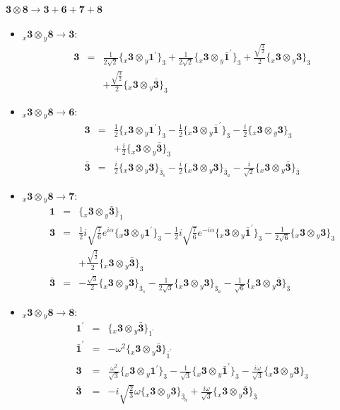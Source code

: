 \documentclass[english]{article}
\newcommand{\rep}[1]{\mathbf{#1}}
\newcommand{\repx}[2]{{}_{#2}\mathbf{#1}}
\newcommand{\subcg}[3]{\big\{ \repx{#1}{x}\otimes\repx{#2}{y}\big\}^{}_{#3}}
\begin{document}
\paragraph*{\Large $\rep{3}\otimes\rep{8}\to\rep{3}+\rep{6}+\rep{7}+\rep{8}$}
\begin{itemize}
\item $\repx{3}{x}\otimes\repx{8}{y}\to\rep{3}$:
\begin{eqnarray*}
\rep{3} &=& \frac{1}{2 \sqrt{2}}\subcg{3}{1^{\prime}}{3}+\frac{1}{2 \sqrt{2}}\subcg{3}{\bar{1}^{\prime}}{3}+\frac{\sqrt{\frac{3}{2}}}{2}\subcg{3}{3}{3} \\ 
 & & +\frac{\sqrt{\frac{3}{2}}}{2}\subcg{3}{\bar{3}}{3}
\end{eqnarray*}
\item $\repx{3}{x}\otimes\repx{8}{y}\to\rep{6}$:
\begin{eqnarray*}
\rep{3} &=& \frac{1}{2}\subcg{3}{1^{\prime}}{3}-\frac{1}{2}\subcg{3}{\bar{1}^{\prime}}{3}-\frac{i}{2}\subcg{3}{3}{3} \\ 
 & & +\frac{i}{2}\subcg{3}{\bar{3}}{3}
\\
\rep{\bar{3}} &=& \frac{i}{2}\subcg{3}{3}{\bar{3}_{s}}-\frac{i}{2}\subcg{3}{3}{\bar{3}_{a}}-\frac{i}{\sqrt{2}}\subcg{3}{\bar{3}}{\bar{3}}
\end{eqnarray*}
\item $\repx{3}{x}\otimes\repx{8}{y}\to\rep{7}$:
\begin{eqnarray*}
\rep{1} &=& \subcg{3}{\bar{3}}{1}
\\
\rep{3} &=& \frac{1}{2} i \sqrt{\frac{7}{6}} e^{i \alpha }\subcg{3}{1^{\prime}}{3}-\frac{1}{2} i \sqrt{\frac{7}{6}} e^{-i \alpha }\subcg{3}{\bar{1}^{\prime}}{3}-\frac{1}{2 \sqrt{6}}\subcg{3}{3}{3} \\ 
 & & +\frac{\sqrt{\frac{3}{2}}}{2}\subcg{3}{\bar{3}}{3}
\\
\rep{\bar{3}} &=& -\frac{\sqrt{3}}{2}\subcg{3}{3}{\bar{3}_{s}}-\frac{1}{2 \sqrt{3}}\subcg{3}{3}{\bar{3}_{a}}-\frac{1}{\sqrt{6}}\subcg{3}{\bar{3}}{\bar{3}}
\end{eqnarray*}
\item $\repx{3}{x}\otimes\repx{8}{y}\to\rep{8}$:
\begin{eqnarray*}
\rep{1^{\prime}} &=& \subcg{3}{\bar{3}}{1^{\prime}}
\\
\rep{\bar{1}^{\prime}} &=& -\omega ^2\subcg{3}{\bar{3}}{\bar{1}^{\prime}}
\\
\rep{3} &=& \frac{\omega ^2}{\sqrt{3}}\subcg{3}{1^{\prime}}{3}-\frac{1}{\sqrt{3}}\subcg{3}{\bar{1}^{\prime}}{3}-\frac{i \omega }{\sqrt{3}}\subcg{3}{3}{3}
\\
\rep{\bar{3}} &=& -i \sqrt{\frac{2}{3}} \omega\subcg{3}{3}{\bar{3}_{a}}+\frac{i \omega }{\sqrt{3}}\subcg{3}{\bar{3}}{\bar{3}}
\end{eqnarray*}
\end{itemize}
\end{document}
